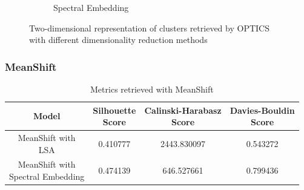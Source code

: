 \begin{figure}
\begin{subfigure}{.3\textwidth}
    \caption{Spectral Embedding}
    \label{fig:optics_spectral}
  \end{subfigure}
  \caption{Two-dimensional representation of clusters retrieved by OPTICS with different dimensionality reduction methods}
  \label{fig:optics}
\end{figure}

\subsubsection{MeanShift}

\begin{table}[]
  \centering
  \begin{tabular}{c|c|c|c}
    Model &  \shortstack[c]{Silhouette \\ Score} & \shortstack[c]{Calinski-Harabasz \\ Score} &  \shortstack[c]{Davies-Bouldin \\ Score}  \\
    \hline
    \hline
    \shortstack[c]{MeanShift with \\ LSA} & 0.410777 & 2443.830097 & 0.543272 \\
    \hline
    \shortstack[c]{MeanShift with \\ Spectral Embedding} & 0.474139 & 646.527661 & 0.799436 \\
   \end{tabular}
  \caption{Metrics retrieved with MeanShift}
  \label{tab:scores_mean_shift}
\end{table}

